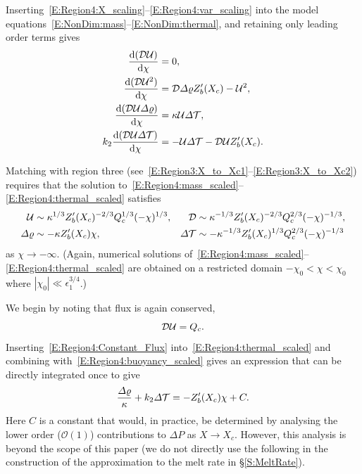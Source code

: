 \documentclass[openacc]{rsproca_new}%
\newcommand{\dd}[2]{\frac{\mathrm{d} #1}{\mathrm{d} #2}}
\newcommand{\order}[1]{\mathcal{O}(#1)}
\newcommand{\epsone}{\epsilon_{1}} %
\begin{document}
Inserting~\eqref{E:Region4:X_scaling}--\eqref{E:Region4:var_scaling} into the model equations~\eqref{E:NonDim:mass}--\eqref{E:NonDim:thermal}, and retaining only leading order terms gives
\begin{align}
\dd{(\D\U)}{\chi} &=0,\label{E:Region4:mass_scaled}\\
\dd{(\D \U^2)}{\chi} &=  \D \p Z_b'(X_c) -\U^2,\label{E:Region4:mom_scaled}\\
\dd{(\D\U\p)}{\chi} &=\lambda  \U\t,\label{E:Region4:buoyancy_scaled}\\
k_2 \dd{(\D \U \t)}{\chi} &=- \U \t - \D \U Z_b'(X_c).\label{E:Region4:thermal_scaled}
\end{align}

Matching with region three (see~\eqref{E:Region3:X_to_Xc1}--\eqref{E:Region3:X_to_Xc2}) requires that the solution to~\eqref{E:Region4:mass_scaled}--\eqref{E:Region4:thermal_scaled} satisfies
\begin{align}
\mathcal{U} &\sim \kappa^{1/3}Z_b'(X_c)^{-2/3}Q_c^{1/3} (-\chi)^{1/3}, &  \mathcal{D} &\sim \kappa^{-1/3} Z_b'(X_c)^{-2/3} Q_c^{2/3}(-\chi)^{-1/3}\label{E:Region4:far_field1},\\
\varDelta \varrho &\sim - \kappa Z_b'(X_c) \chi, & \varDelta \mathcal{T} &\sim -\kappa^{-1/3} Z_b'(X_c)^{1/3} Q_c^{2/3}(-\chi)^{-1/3}\label{E:Region4:far_field2}
\end{align}
as $\chi \to -\infty$. (Again, numerical solutions of~\eqref{E:Region4:mass_scaled}--\eqref{E:Region4:thermal_scaled} are obtained on a restricted domain $-\chi_0 < \chi < \chi_0$ where $|\chi_0| \ll \epsone^{3/4}$.)

We begin by noting that flux is again conserved,
\begin{equation}\label{E:Region4:Constant_Flux}
\mathcal{D}\mathcal{U}  = Q_c.
\end{equation}
Inserting~\eqref{E:Region4:Constant_Flux} into~\eqref{E:Region4:thermal_scaled} and combining with~\eqref{E:Region4:buoyancy_scaled} gives an expression that can be directly integrated once to give
\begin{equation}\label{E:Region4:Linear_p_t}
\frac{\varDelta \varrho}{\kappa} + k_2 \varDelta \mathcal{T} = -Z_b'(X_c)\chi + C.
\end{equation}
Here $C$ is a constant that would, in practice, be determined by analysing the lower order ($\order{1}$) contributions to $\Delta P$ as $X \to X_c$. However, this analysis is beyond the scope of this paper (we do not directly use the following in the construction of the approximation to the melt rate in \S\ref{S:MeltRate}).
\end{document}
